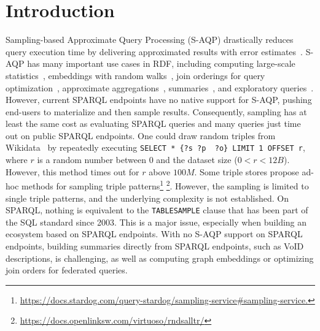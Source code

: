 
\section{Introduction}

Sampling-based Approximate Query Processing (S-AQP) drastically reduces query
execution time by delivering approximated results with error
estimates~\cite{DBLP:conf/sigmod/AgarwalMKTJMMS14}. S-AQP has many important use cases in RDF, including
computing large-scale statistics~\cite{soulet2019anytime,10.1007/978-3-319-18818-8_14},
embeddings with random walks~\cite{ristoski2016rdf2vec}, join
orderings for query optimization~\cite{DBLP:conf/cidr/LeisRGK017},
approximate
aggregations~\cite{wang2022approximate},
summaries~\cite{10.1007/978-3-030-49461-2_10}, and exploratory
queries~\cite{DBLP:conf/sigmod/AgarwalMKTJMMS14}.
%
However, current SPARQL endpoints have no native support for S-AQP,
pushing end-users to materialize and then sample
results. Consequently, sampling has at least  the same cost as evaluating
SPARQL queries and many queries just time out on public SPARQL
endpoints.
%
One could draw random triples from Wikidata~\cite{soulet2019anytime}
by repeatedly executing \lstinline[language=SPARQL]|SELECT * {?s ?p  ?o} LIMIT 1 OFFSET r|,
where $r$ is a random number between $0$ and
the dataset size ($0<r<12B$). However, this method times out for $r$
above $100M$. Some triple stores propose ad-hoc methods for sampling
triple patterns\footnote{\url{https://docs.stardog.com/query-stardog/sampling-service\#sampling-service.}}
\footnote{\url{https://docs.openlinksw.com/virtuoso/rndsalltr/}}.
However, the sampling is limited to single triple patterns, and the
underlying complexity is not established.  On SPARQL, nothing is
equivalent to the \texttt{TABLESAMPLE} clause that has been part of the SQL
standard since 2003. This is a major issue, especially when building an ecosystem based on SPARQL endpoints. With no S-AQP support
on SPARQL endpoints, building summaries directly from SPARQL endpoints, such as VoID descriptions, is challenging, as well as computing graph
embeddings or optimizing join orders for federated queries.


